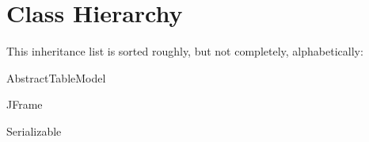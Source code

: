 \section{Class Hierarchy}
This inheritance list is sorted roughly, but not completely, alphabetically\+:\begin{DoxyCompactList}
\item Abstract\+Table\+Model\begin{DoxyCompactList}
\item {}
\end{DoxyCompactList}
\item J\+Frame\begin{DoxyCompactList}
\item {}
\end{DoxyCompactList}
\item Serializable\begin{DoxyCompactList}
\item {}
\end{DoxyCompactList}
\end{DoxyCompactList}
